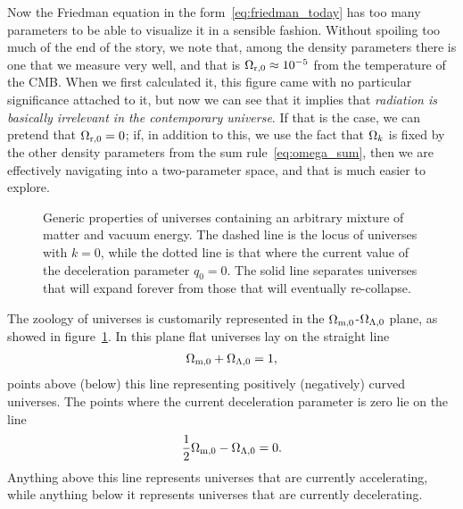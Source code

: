Now the Friedman equation in the form~\eqref{eq:friedman_today} has too many
parameters to be able to visualize it in a sensible fashion. Without spoiling too
much of the end of the story, we note that, among the density parameters there is
one that we measure very well, and that is $\Omega_\text{r,0} \approx 10^{-5}$ from the
temperature of the CMB. When we first calculated it, this figure came with no
particular significance attached to it, but now we can see that it implies that
\emph{radiation is basically irrelevant in the contemporary universe}.
If that is the case, we can pretend that $\Omega_\text{r,0} = 0$; if, in addition to
this, we use the fact that $\Omega_k$ is fixed by the other density parameters from
the sum rule~\eqref{eq:omega_sum}, then we are effectively navigating into a
two-parameter space, and that is much easier to explore.

\begin{figure}[!htbp]
  
  \caption{Generic properties of universes containing an arbitrary mixture of matter
  and vacuum energy. The dashed line is the locus of universes with $k = 0$, while
  the dotted line is that where the current value of the deceleration parameter
  $q_0 = 0$. The solid line separates universes that will expand forever from those
  that will eventually re-collapse.}
  \label{fig:cosmo_map}
\end{figure}

The zoology of universes is customarily represented in the $\Omega_\text{m,0}$-$\Omega_{\Lambda,0}$
plane, as showed in figure~\ref{fig:cosmo_map}. In this plane flat universes lay on
the straight line
\begin{align*}
  \Omega_\text{m,0} + \Omega_{\Lambda,0} = 1,
\end{align*}
points above (below) this line representing positively (negatively) curved universes.
The points where the current deceleration parameter is zero lie on the line
\begin{align*}
  \frac{1}{2} \Omega_\text{m,0} - \Omega_{\Lambda,0} = 0.
\end{align*}
Anything above this line represents universes that are currently accelerating, while
anything below it represents universes that are currently decelerating.


